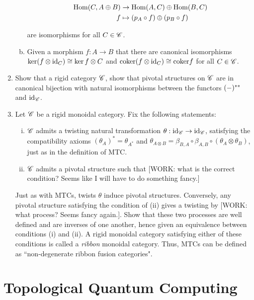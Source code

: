 \documentclass{article}
\theoremstyle{definition}
\numberwithin{figure}{section}
\begin{document}
\begin{enumerate}[\thesection .1.]
\begin{enumerate}[(a)]
\begin{align*}
\mathrm{Hom}(C, A\oplus B)&\to \mathrm{Hom}(A,C)\oplus \mathrm{Hom}(B,C)\\
f &\mapsto (p_A\circ f)\oplus (p_B\circ f)
\end{align*}

are isomorphisms for all $C\in \mathscr{C}$.

\item Given a morphism $f:A\to B$ that there are canonical isomorphisms $\ker (f\otimes \mathrm{id}_C)\cong \ker f\otimes C$ and $\mathrm{coker} (f\otimes \mathrm{id}_C)\cong \mathrm{coker} f$ for all $C\in \mathscr{C}$.
\end{enumerate}

\item Show that a rigid category $\mathscr{C}$, show that pivotal structures on $\mathscr{C}$ are in canonical bijection with natural isomorphisms between the functors $(\--)^{**}$ and $\mathrm{id}_{\mathscr{C}}$.

\item  Let $\mathscr{C}$ be a rigid monoidal category. Fix the following statements:

\begin{enumerate}[(i)]
\item $\mathscr{C}$ admits a twisting natural transformation $\theta:\mathrm{id}_{\mathscr{C}}\to \mathrm{id}_{\mathscr{C}}$, satisfying the compatibility axioms $(\theta_A)^{*}=\theta_{A^*}$ and $\theta_{A\otimes B}=\beta_{B,A}\circ \beta_{A,B}\circ (\theta_{A}\otimes \theta_{B})$, just as in the definition of MTC.

\item $\mathscr{C}$ admits a pivotal structure such that [WORK: what is the correct condition? Seems like I will have to do something fancy.]
\end{enumerate}

Just as with MTCs, twists $\theta$ induce pivotal structures. Conversely, any pivotal structure satisfying the condition of (ii) gives a twisting by [WORK: what process? Seems fancy again.]. Show that these two processes are well defined and are inverses of one another, hence given an equivalence between conditions (i) and (ii). A rigid monoidal category satisfying either of these conditions is called a \textit{ribbon} monoidal category. Thus, MTCs can be defined as ``non-degenerate ribbon fusion categories".
\end{enumerate}

\section{Topological Quantum Computing}
\label{Topological Quantum Computing}
\end{document}
